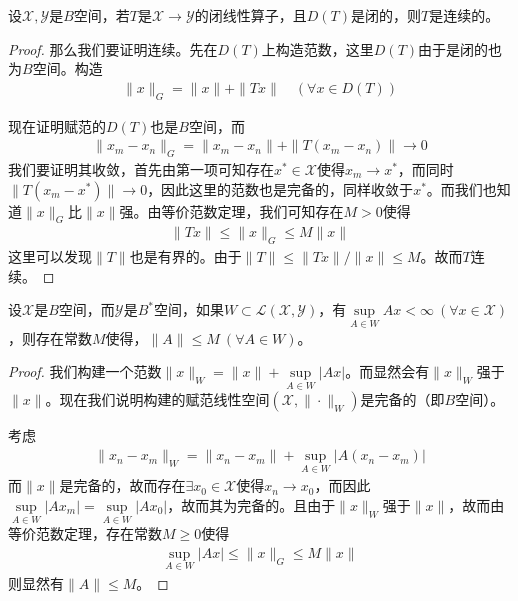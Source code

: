 	\begin{theorem}[闭图像定理]
		设$\mathscr{X},\mathscr{Y}$是$B$空间，若$T$是$\mathscr{X}\to\mathscr{Y}$的闭线性算子，且$D(T)$是闭的，则$T$是连续的。
	\end{theorem}
	\begin{proof}
		那么我们要证明连续。先在$D(T)$上构造范数，这里$D(T)$由于是闭的也为$B$空间。构造
		\begin{align*}
			\|x\|_G = \|x\| + \|Tx\|\quad (\forall x\in D(T))
		\end{align*}
		
		现在证明赋范的$D(T)$也是$B$空间，而
		\begin{align*}
			\|x_m - x_n\|_G = \|x_m - x_n\| + \|T(x_m - x_n)\| \to 0
		\end{align*}
		我们要证明其收敛，首先由第一项可知存在$x^*\in\mathscr{X}$使得$x_m\to x^*$，而同时$\|T(x_m - x^*)\|\to 0$，因此这里的范数也是完备的，同样收敛于$x^*$。而我们也知道$\|x\|_G$比$\|x\|$强。由等价范数定理，我们可知存在$M > 0$使得
		\begin{align*}
			\|Tx\| \leqslant \|x\|_G \leqslant M\|x\|
		\end{align*}
		这里可以发现$\|T\|$也是有界的。由于$\|T\|\leqslant \|Tx\| / \|x\| \leqslant M$。故而$T$连续。
	\end{proof}
	
	\begin{theorem}[共鸣定理或一致有界定理]
		设$\mathscr{X}$是$B$空间，而$\mathscr{Y}$是$B^*$空间，如果$W\subset\mathscr{L}(\mathscr{X},\mathscr{Y})$，有$\sup\limits_{A\in W} Ax < \infty\ (\forall x\in\mathscr{X})$，则存在常数$M$使得，$\|A\|\leqslant M\ (\forall A\in W)$。
	\end{theorem}
	\begin{proof}
		我们构建一个范数$\|x\|_W = \|x\| + \sup\limits_{A\in W} |Ax|$。而显然会有$\|x\|_W$强于$\|x\|$。现在我们说明构建的赋范线性空间$(\mathscr{X},\|\cdot\|_W)$是完备的（即$B$空间）。
		
		考虑
		\begin{align*}
			\|x_n - x_m\|_W = \|x_n - x_m\| + \sup\limits_{A\in W} |A(x_n - x_m)|
		\end{align*}
		而$\|x\|$是完备的，故而存在$\exists x_0\in\mathscr{X}$使得$x_n\to x_0$，而因此$\sup\limits_{A\in W} |Ax_m| = \sup\limits_{A\in W} |Ax_0|$，故而其为完备的。且由于$\|x\|_W$强于$\|x\|$，故而由等价范数定理，存在常数$M\geqslant 0$使得
		\begin{align*}
			\sup\limits_{A\in W} |Ax| \leqslant \|x\|_G \leqslant M\|x\|
		\end{align*}
		则显然有$\|A\|\leqslant M$。
	\end{proof}
	
